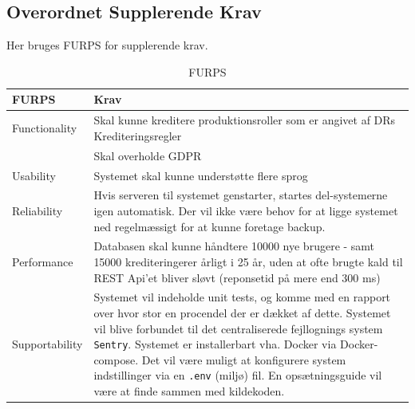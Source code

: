 \newpage
\subsection{Overordnet Supplerende Krav}

Her bruges FURPS for supplerende krav.
\begin{table}[H]
    \centering
    \begin{tabular}{|p{3cm}|p{13cm}|}
    \hline
    \textbf{FURPS}           &    \textbf{Krav} \\
    \hline
    Functionality           & Skal kunne kreditere produktionsroller som er angivet af DRs Krediteringsregler \\
                            & Skal overholde GDPR \\
    \hline
    Usability       & Systemet skal kunne understøtte flere sprog \\
    \hline
    Reliability     &  Hvis serveren til systemet genstarter, startes del-systemerne igen automatisk. Der vil ikke være behov for at ligge systemet ned regelmæssigt for at kunne foretage backup. \\
    \hline
    Performance     &  Databasen skal kunne håndtere 10000 nye brugere - samt 15000 krediteringerer årligt i 25 år, uden at ofte brugte kald til REST Api'et bliver sløvt (reponsetid på mere end 300 ms) \\
    \hline
    Supportability  &  Systemet vil indeholde unit tests, og komme med en rapport over hvor stor en procendel der er dækket af dette. %
    Systemet vil blive forbundet til det centraliserede fejllognings system \texttt{Sentry}.
    Systemet er installerbart vha. Docker via Docker-compose. %
    Det vil være muligt at konfigurere system indstillinger via en \texttt{.env} (miljø) fil.
    En opsætningsguide vil være at finde sammen med kildekoden. 
    \\ \hline
    \end{tabular}
    \caption{FURPS}
    \label{tab:furps}
\end{table} 


